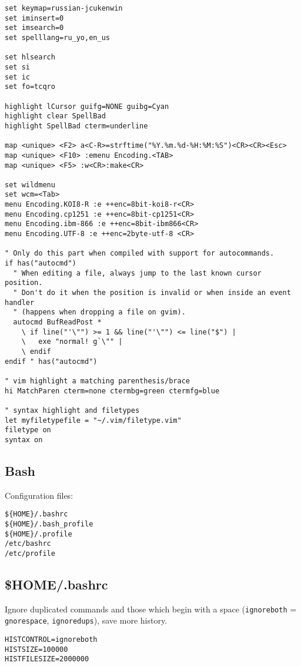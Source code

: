 \documentclass[12pt,a4paper]{article}
\begin{document}
\begin{verbatim}
set keymap=russian-jcukenwin
set iminsert=0
set imsearch=0
set spelllang=ru_yo,en_us

set hlsearch
set si
set ic
set fo=tcqro

highlight lCursor guifg=NONE guibg=Cyan
highlight clear SpellBad
highlight SpellBad cterm=underline

map <unique> <F2> a<C-R>=strftime("%Y.%m.%d-%H:%M:%S")<CR><CR><Esc>
map <unique> <F10> :emenu Encoding.<TAB>
map <unique> <F5> :w<CR>:make<CR>

set wildmenu
set wcm=<Tab>
menu Encoding.KOI8-R :e ++enc=8bit-koi8-r<CR>
menu Encoding.cp1251 :e ++enc=8bit-cp1251<CR>
menu Encoding.ibm-866 :e ++enc=8bit-ibm866<CR>
menu Encoding.UTF-8 :e ++enc=2byte-utf-8 <CR>

" Only do this part when compiled with support for autocommands.
if has("autocmd")
  " When editing a file, always jump to the last known cursor position.
  " Don't do it when the position is invalid or when inside an event handler
  " (happens when dropping a file on gvim).
  autocmd BufReadPost *
    \ if line("'\"") >= 1 && line("'\"") <= line("$") |
    \   exe "normal! g`\"" |
    \ endif
endif " has("autocmd")

" vim highlight a matching parenthesis/brace
hi MatchParen cterm=none ctermbg=green ctermfg=blue

" syntax highlight and filetypes
let myfiletypefile = "~/.vim/filetype.vim"
filetype on
syntax on
\end{verbatim}

\subsection{Bash}

Configuration files:

\begin{verbatim}
${HOME}/.bashrc
${HOME}/.bash_profile
${HOME}/.profile
/etc/bashrc
/etc/profile
\end{verbatim}

\subsection{\$HOME/.bashrc}

Ignore duplicated commands and those which begin with a space (\verb"ignoreboth"
= \verb"gnorespace", \verb"ignoredups"), save more history.

\begin{verbatim}
HISTCONTROL=ignoreboth
HISTSIZE=100000
HISTFILESIZE=2000000
\end{verbatim}
\end{document}
